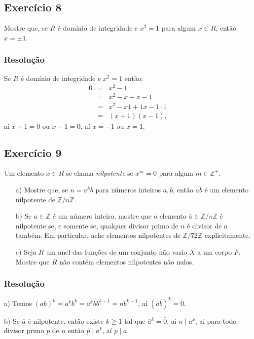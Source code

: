 \documentclass[10pt,a4paper]{article}
\begin{document}
\subsection*{Exercício 8}

Mostre que, se $R$ é domínio de integridade e $x^2=1$ para algum $x\in R$, então $x=\pm1$.

\subsubsection*{Resolução}

Se $R$ é domínio de integridade e $x^2=1$ então:
\[
\begin{array}{rcl}
0&=&x^2-1\\&=&x^2-x+x-1\\&=&x^2-x1+1x-1\cdot 1\\&=&(x+1)(x-1),
\end{array}
\]
aí $x+1=0$ ou $x-1=0$, aí $x=-1$ ou $x=1$.

\subsection*{Exercício 9}

Um elemento $x\in R$ se chama \textit{nilpotente} se $x^m=0$ para algum $m\in\mathbb{Z}^+$.

\begin{itemize}
\item[a)] Mostre que, se $n=a^kb$ para números inteiros $a,b$, então $\overline{ab}$ é um elemento nilpotente de $\mathbb{Z}/n\mathbb{Z}$.
\item[b)] Se $a\in\mathbb{Z}$ é um número inteiro, mostre que o elemento $\overline{a}\in\mathbb{Z}/n\mathbb{Z}$ é nilpotente se, e somente se, qualquer divisor primo de $n$ é divisor de $a$ também. Em particular, ache elementos nilpotentes de $\mathbb{Z}/72\mathbb{Z}$ explicitamente.
\item[c)] Seja $R$ um anel das funções de um conjunto não vazio $X$ a um corpo $F$. Mostre que $R$ não contém elementos nilpotentes não nulos.
\end{itemize}

\subsubsection*{Resolução}

a) Temos $(ab)^k=a^kb^k=a^kbb^{k-1}=nb^{k-1}$, aí $(\overline{a}\overline{b})^k=\overline{0}$.

\medskip
\noindent
b) Se $\overline{a}$ é nilpotente, então existe $k\geq 1$ tal que $\overline{a}^k=\overline{0}$, aí $n\mid a^k$, aí para todo divisor primo $p$ de $n$ então $p\mid a^k$, aí $p\mid a$.
\end{document}
